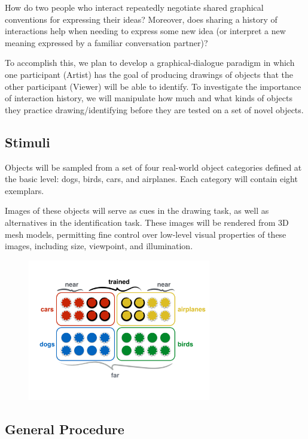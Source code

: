 \documentclass[12pt]{article}
\begin{document}
How do two people who interact repeatedly negotiate shared graphical conventions for expressing their ideas? Moreover, does sharing a history of interactions help when needing to express some new idea (or interpret a new meaning expressed by a familiar conversation partner)? 

To accomplish this, we plan to develop a graphical-dialogue paradigm in which one participant (Artist) has the goal of producing drawings of objects that the other participant (Viewer) will be able to identify. To investigate the importance of interaction history, we will manipulate how much and what kinds of objects they practice drawing/identifying before they are tested on a set of novel objects.

\subsection{Stimuli}

Objects will be sampled from a set of four real-world object categories defined at the basic level: dogs, birds, cars, and airplanes. Each category will contain eight exemplars. 

Images of these objects will serve as cues in the drawing task, as well as alternatives in the identification task. These images will be rendered from 3D mesh models, permitting fine control over low-level visual properties of these images, including size, viewpoint, and illumination. 

\begin{figure}[hbtp]
\begin{center}
\includegraphics[width=80mm]{figures/design.pdf}
\end{center}
\end{figure}
\vspace{-5mm}

\subsection{General Procedure}
\end{document}
